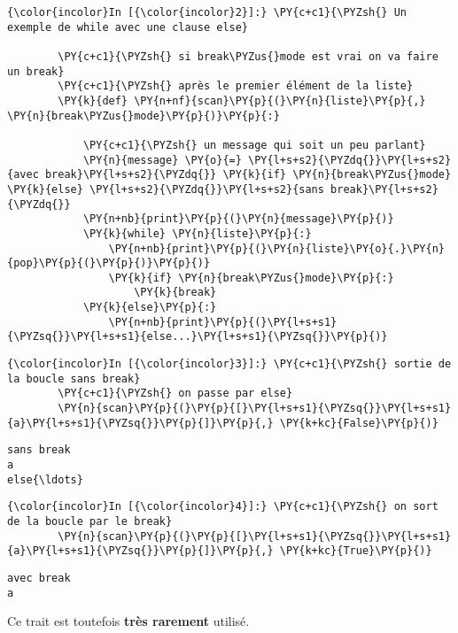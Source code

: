     \begin{Verbatim}[commandchars=\\\{\}]
{\color{incolor}In [{\color{incolor}2}]:} \PY{c+c1}{\PYZsh{} Un exemple de while avec une clause else}
        
        \PY{c+c1}{\PYZsh{} si break\PYZus{}mode est vrai on va faire un break}
        \PY{c+c1}{\PYZsh{} après le premier élément de la liste}
        \PY{k}{def} \PY{n+nf}{scan}\PY{p}{(}\PY{n}{liste}\PY{p}{,} \PY{n}{break\PYZus{}mode}\PY{p}{)}\PY{p}{:}
        
            \PY{c+c1}{\PYZsh{} un message qui soit un peu parlant}
            \PY{n}{message} \PY{o}{=} \PY{l+s+s2}{\PYZdq{}}\PY{l+s+s2}{avec break}\PY{l+s+s2}{\PYZdq{}} \PY{k}{if} \PY{n}{break\PYZus{}mode} \PY{k}{else} \PY{l+s+s2}{\PYZdq{}}\PY{l+s+s2}{sans break}\PY{l+s+s2}{\PYZdq{}}
            \PY{n+nb}{print}\PY{p}{(}\PY{n}{message}\PY{p}{)}
            \PY{k}{while} \PY{n}{liste}\PY{p}{:}
                \PY{n+nb}{print}\PY{p}{(}\PY{n}{liste}\PY{o}{.}\PY{n}{pop}\PY{p}{(}\PY{p}{)}\PY{p}{)}
                \PY{k}{if} \PY{n}{break\PYZus{}mode}\PY{p}{:}
                    \PY{k}{break}
            \PY{k}{else}\PY{p}{:}
                \PY{n+nb}{print}\PY{p}{(}\PY{l+s+s1}{\PYZsq{}}\PY{l+s+s1}{else...}\PY{l+s+s1}{\PYZsq{}}\PY{p}{)}
\end{Verbatim}


    \begin{Verbatim}[commandchars=\\\{\}]
{\color{incolor}In [{\color{incolor}3}]:} \PY{c+c1}{\PYZsh{} sortie de la boucle sans break}
        \PY{c+c1}{\PYZsh{} on passe par else}
        \PY{n}{scan}\PY{p}{(}\PY{p}{[}\PY{l+s+s1}{\PYZsq{}}\PY{l+s+s1}{a}\PY{l+s+s1}{\PYZsq{}}\PY{p}{]}\PY{p}{,} \PY{k+kc}{False}\PY{p}{)}
\end{Verbatim}


    \begin{Verbatim}[commandchars=\\\{\}]
sans break
a
else{\ldots}

    \end{Verbatim}

    \begin{Verbatim}[commandchars=\\\{\}]
{\color{incolor}In [{\color{incolor}4}]:} \PY{c+c1}{\PYZsh{} on sort de la boucle par le break}
        \PY{n}{scan}\PY{p}{(}\PY{p}{[}\PY{l+s+s1}{\PYZsq{}}\PY{l+s+s1}{a}\PY{l+s+s1}{\PYZsq{}}\PY{p}{]}\PY{p}{,} \PY{k+kc}{True}\PY{p}{)}
\end{Verbatim}


    \begin{Verbatim}[commandchars=\\\{\}]
avec break
a

    \end{Verbatim}

    Ce trait est toutefois \textbf{très rarement} utilisé.